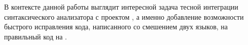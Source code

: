 В контексте данной работы выглядит интересной задача тесной интеграции синтаксического анализатора с проектом \merlin{}, а именно добавление возможности быстрого исправления кода, написанного со смешением двух языков, на правильный код на \ReasonML{}.



